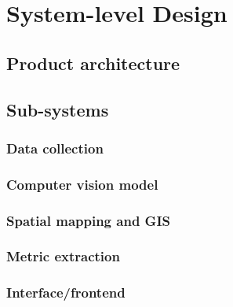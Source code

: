 \chapter{System-level Design}

\section{Product architecture}

\section{Sub-systems}

\subsection{Data collection}

\subsection{Computer vision model}

\subsection{Spatial mapping and GIS}

\subsection{Metric extraction}

\subsection{Interface/frontend}
